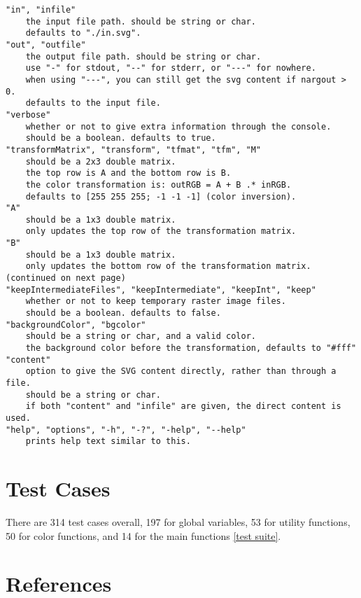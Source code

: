 \documentclass[12pt]{article}
\begin{document}
\begin{verbatim}
"in", "infile"
    the input file path. should be string or char.
    defaults to "./in.svg".
"out", "outfile"
    the output file path. should be string or char.
    use "-" for stdout, "--" for stderr, or "---" for nowhere.
    when using "---", you can still get the svg content if nargout > 0.
    defaults to the input file.
"verbose"
    whether or not to give extra information through the console.
    should be a boolean. defaults to true.
"transformMatrix", "transform", "tfmat", "tfm", "M"
    should be a 2x3 double matrix.
    the top row is A and the bottom row is B.
    the color transformation is: outRGB = A + B .* inRGB.
    defaults to [255 255 255; -1 -1 -1] (color inversion).
"A"
    should be a 1x3 double matrix.
    only updates the top row of the transformation matrix.
"B"
    should be a 1x3 double matrix.
    only updates the bottom row of the transformation matrix.
(continued on next page)
"keepIntermediateFiles", "keepIntermediate", "keepInt", "keep"
    whether or not to keep temporary raster image files.
    should be a boolean. defaults to false.
"backgroundColor", "bgcolor"
    should be a string or char, and a valid color.
    the background color before the transformation, defaults to "#fff"
"content"
    option to give the SVG content directly, rather than through a file.
    should be a string or char.
    if both "content" and "infile" are given, the direct content is used.
"help", "options", "-h", "-?", "-help", "--help"
    prints help text similar to this.
\end{verbatim}

\section{Test Cases}

There are 314 test cases overall, 197 for global variables, 53 for utility functions, 50 for color functions, and 14 for the main functions \ref{test suite}.

\section{References}
\end{document}
